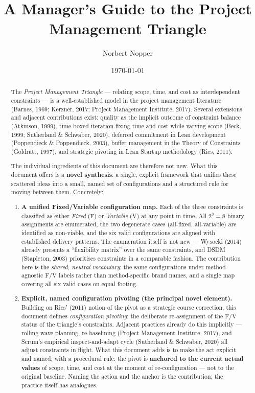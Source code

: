\documentclass[11pt,a4paper]{article}
\title{A Manager's Guide to the Project Management Triangle}
\author{Norbert Nopper}
\date{\today}
\begin{document}
\maketitle

\begin{abstract}
\noindent
The \emph{Project Management Triangle} --- relating scope, time, and cost as
interdependent constraints --- is a well-established model in the project
management literature (Barnes, 1969; Kerzner, 2017; Project Management
Institute, 2017). Several extensions and adjacent contributions exist:
quality as the implicit outcome of constraint balance (Atkinson, 1999),
time-boxed iteration fixing time and cost while varying scope (Beck, 1999;
Sutherland \& Schwaber, 2020), deferred commitment in Lean development
(Poppendieck \& Poppendieck, 2003), buffer management in the Theory of
Constraints (Goldratt, 1997), and strategic pivoting in Lean Startup
methodology (Ries, 2011).

The individual ingredients of this document are therefore not new. What
this document offers is a \textbf{novel synthesis}: a single, explicit
framework that unifies these scattered ideas into a small, named set of
configurations and a structured rule for moving between them. Concretely:

\begin{enumerate}[leftmargin=*]
  \item \textbf{A unified Fixed/Variable configuration map.} Each of the
  three constraints is classified as either \emph{Fixed} (F) or
  \emph{Variable} (V) at any point in time. All $2^3 = 8$ binary
  assignments are enumerated, the two degenerate cases (all-fixed,
  all-variable) are identified as non-viable, and the six valid
  configurations are aligned with established delivery patterns. The
  enumeration itself is not new --- Wysocki (2014) already presents a
  ``flexibility matrix'' over the same constraints, and DSDM (Stapleton,
  2003) prioritises constraints in a comparable fashion. The contribution
  here is the \emph{shared, neutral vocabulary}: the same configurations
  under method-agnostic F/V labels rather than method-specific brand
  names, and a single map covering all six valid cases on equal footing.

  \item \textbf{Explicit, named configuration pivoting (the principal
  novel element).} Building on Ries' (2011) notion of the pivot as a
  strategic course correction, this document defines \emph{configuration
  pivoting}: the deliberate re-assignment of the F/V status of the
  triangle's constraints. Adjacent practices already do this implicitly
  --- rolling-wave planning, re-baselining (Project Management Institute,
  2017), and Scrum's empirical inspect-and-adapt cycle (Sutherland \&
  Schwaber, 2020) all adjust constraints in flight. What this document
  adds is to make the act explicit and named, with a procedural rule: the
  pivot is \textbf{anchored to the current actual values} of scope, time,
  and cost at the moment of re-configuration --- not to the original
  baseline. Naming the action and the anchor is the contribution; the
  practice itself has analogues.


\end{enumerate}
\end{abstract}
\end{document}
